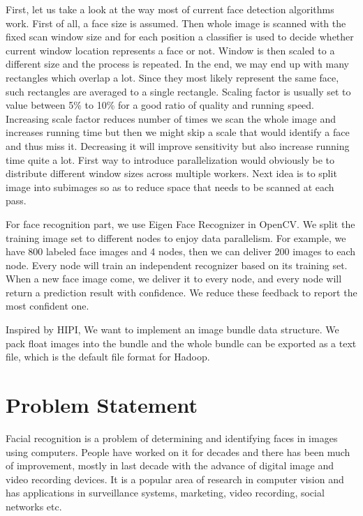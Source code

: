 \documentclass[11pt, draftclsnofoot, onecolumn]{IEEEtran}
\begin{document}
First, let us take a look at the way most of current face detection algorithms work. First of all, a face size is assumed. Then whole image is scanned with the fixed scan window size and for each position a classifier is used to decide whether current window location represents a face or not. Window is then scaled to a different size and the process is repeated. In the end, we may end up with many rectangles which overlap a lot. Since they most likely represent the same face, such rectangles are averaged to a single rectangle. Scaling factor is usually set to value between 5\% to 10\% for a good ratio of quality and running speed. Increasing scale factor reduces number of times we scan the whole image and increases running time but then we might skip a scale that would identify a face and thus miss it. Decreasing it will improve sensitivity but also increase running time quite a lot. First way to introduce parallelization would obviously be to distribute different window sizes across multiple workers. Next 
idea is to split image into subimages so as to reduce space that needs to be scanned at each pass.

For face recognition part, we use Eigen Face Recognizer in OpenCV. We split the training image set to different nodes to enjoy data parallelism. For example, we have 800 labeled face images and 4 nodes, then we can deliver 200 images to each node. Every node will train an independent recognizer based on its training set. When a new face image come, we deliver it to every node, and every node will return a prediction result with confidence. We reduce these feedback to report the most confident one. 

Inspired by HIPI\cite{sweeney2011hipi}, We want to implement an image bundle data structure. We pack float images into the bundle and the whole bundle can be exported as a text file, which is the default file format for Hadoop. 

\section{Problem Statement} \label{sec:problem}

Facial recognition is a problem of determining and identifying faces in images using computers. People have worked on it for decades and there has been much of improvement, mostly in last decade with the advance of digital image and video recording devices. It is a popular area of research in computer vision and has applications in surveillance systems, marketing, video recording, social networks etc.
\end{document}
